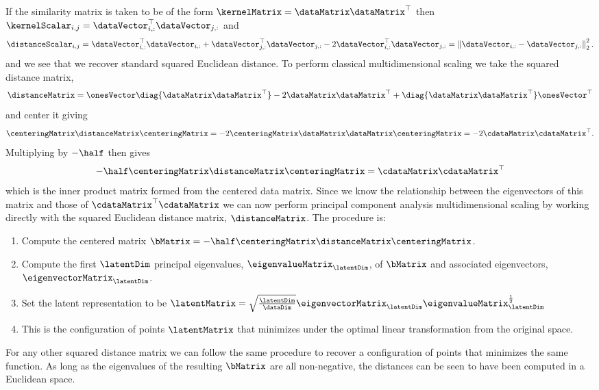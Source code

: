 If the similarity matrix is taken to be of the form $\kernelMatrix=\dataMatrix\dataMatrix^{\top}$
then $\kernelScalar_{i,j}=\dataVector_{i,:}^{\top}\dataVector_{j,:}$
and 
\[
\distanceScalar_{i,j}=\dataVector_{i,:}^{\top}\dataVector_{i,:}+\dataVector_{j,:}^{\top}\dataVector_{j,:}-2\dataVector_{i,:}^{\top}\dataVector_{j,:}=\left\Vert\dataVector_{i,:}-\dataVector_{j,:}\right\Vert_{2}^{2}.
\]
and we see that we recover standard squared Euclidean distance. To perform classical multidimensional scaling we take the squared distance matrix, 
\[
\distanceMatrix = \onesVector\diag{\dataMatrix\dataMatrix^\top} -2\dataMatrix\dataMatrix^\top + \diag{\dataMatrix\dataMatrix^\top}\onesVector^\top
\]
and center it giving 
\[
\centeringMatrix \distanceMatrix \centeringMatrix = -2\centeringMatrix\dataMatrix\dataMatrix\centeringMatrix = -2\cdataMatrix\cdataMatrix^\top.
\]
Multiplying by $-\half$ then gives 
\[
-\half \centeringMatrix \distanceMatrix \centeringMatrix = \cdataMatrix\cdataMatrix^\top
\]
which is the inner product matrix formed from the centered data matrix. Since we know the relationship between the eigenvectors of this matrix and those of $\cdataMatrix^\top\cdataMatrix$  we can now perform principal component analysis multidimensional scaling by working directly with the squared Euclidean distance matrix, $\distanceMatrix$. The procedure is:
\begin{enumerate}
  \item Compute the centered matrix $\bMatrix = -\half\centeringMatrix\distanceMatrix\centeringMatrix$.
  \item Compute the first $\latentDim$ principal eigenvalues, $\eigenvalueMatrix_\latentDim$, of $\bMatrix$ and associated eigenvectors, $\eigenvectorMatrix_\latentDim$. 
  \item Set the latent representation to be $
    \latentMatrix = \sqrt{\frac{\latentDim}{\dataDim}}\eigenvectorMatrix_\latentDim\eigenvalueMatrix_\latentDim^{\frac{1}{2}} 
$
\item This is the configuration of points $\latentMatrix$ that
  minimizes  under the optimal linear
  transformation from the original space.
\end{enumerate}

For any other squared distance matrix we can follow the same procedure
to recover a configuration of points that minimizes the same
function. As long as the eigenvalues of the resulting $\bMatrix$ are
all non-negative, the distances can be seen to have been computed in a
Euclidean space.
 
